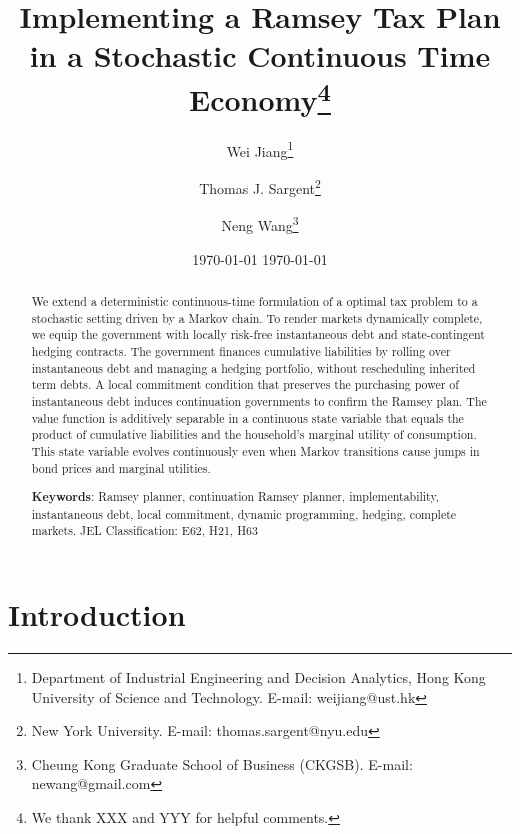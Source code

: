 \documentclass[12pt]{article}
\newcommand{\WJ}[1]{{\textcolor{red}{#1}}}
\begin{document}
\date{%
\today%
}
\title{Implementing a Ramsey Tax Plan in a Stochastic Continuous Time Economy\thanks{We thank XXX and YYY for helpful comments.}}
\date{\today }
\author{	 Wei Jiang\thanks{%
Department of Industrial Engineering and Decision Analytics, Hong Kong University of Science and Technology. E-mail: weijiang@ust.hk } \and Thomas J. Sargent\thanks{New York University. E-mail: thomas.sargent@nyu.edu} \and Neng Wang\thanks{Cheung Kong Graduate School of Business (CKGSB). E-mail: {newang@gmail.com}} }

\maketitle


\begin{abstract}
\noindent
We extend a deterministic continuous-time formulation of a \cite{LucasStokey1983} optimal tax problem to a stochastic setting driven by a Markov chain. To render markets dynamically complete, we equip the government with locally risk-free instantaneous debt and  state-contingent hedging contracts. The government finances cumulative liabilities by rolling over instantaneous debt and managing a hedging portfolio, without rescheduling inherited term debts. A local commitment condition that preserves the purchasing power of instantaneous debt  induces continuation governments to confirm the Ramsey plan.  The value function is additively separable in a continuous state variable  that equals the product of cumulative liabilities and the household's marginal utility of consumption. This state variable  evolves continuously even when Markov transitions cause jumps in bond prices and marginal utilities.

\medskip

\thispagestyle{empty}

\noindent  \textbf{Keywords}: Ramsey planner, continuation Ramsey planner, implementability, instantaneous debt, local commitment, dynamic programming, hedging, complete markets.
\newline
\newline
JEL Classification: E62, H21, H63
\end{abstract} 
%
%
%

\clearpage
{}
\setcounter{page}{1}
\newpage

\section{Introduction}
\end{document}
